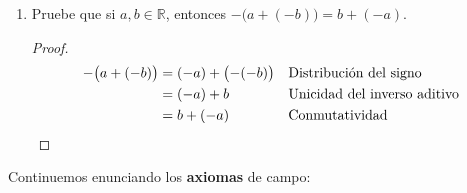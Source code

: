 \documentclass[11pt]{article}
\newcommand{\R}{\mathbb{R}}
\begin{document}
\begin{enumerate}[label=\alph*)]
    \vspace{-1em}\begin{proof} 
        \begin{align*}
            0 &= 0 + 0 && \text{Neutro aditivo} \\
            &= \bigl(a+(-a)\bigr) + \bigl(b + (-b)\bigr) && \text{Inverso aditivo} \\
            &= a + \Bigl((-a)+ \bigl(b + (-b)\bigr)\Bigr) && \text{Asociatividad} \\
            &= a + \Bigl( \bigl((-a)+b\bigr) +(-b)\Bigr) && \text{Asociatividad} \\
            &= a + \Bigl( \bigl(b+(-a)\bigr) +(-b)\Bigr) && \text{Conmutatividad} \\
            &= a + \Bigl( b + \bigl( (-a)+(-b) \bigr) \Bigr) && \text{Asociatividad} \\
            &= (a+b) + \bigl((-a)+ (-b)\bigr) && \text{Asociatividad}
            \end{align*}
            Por la unicidad del inverso aditivo, tenemos que $(-a)+ (-b)=-(a+b)$.\qedhere    
    \end{proof} \vspace{-1em}

    \textbf{Nota:} Cada demostración que realizamos, al ser probada para números reales arbitrarios, esto es, no para elementos de $\R$ en particular, nos permite reutilizar las formas como esquema para otras proposiciones. Por ejemplo, el resultado $-(m+n)=(-m)+(-n)$, nos permite sustituir $m$ y $n$ por cuales quiera números reales, como en el ejemplo que sigue:

    \item Pruebe que si $a,b\in \R$, entonces $-\bigl(a+(-b)\bigr)=b+(-a)$.

    \vspace{-1em}\begin{proof} 
        \begin{align*}
            -\bigl(a+(-b)\bigr)&= (-a) + \bigl(-(-b)\bigr) &&\text{Distribución del signo} \\
            &= (-a) + b &&\text{Unicidad del inverso aditivo} \\
            &= b +(-a) &&\text{Conmutatividad} \qedhere
            \end{align*}    
    \end{proof} \vspace{-1em}
\end{enumerate}

Continuemos enunciando los \textbf{axiomas} de campo:
\end{document}
